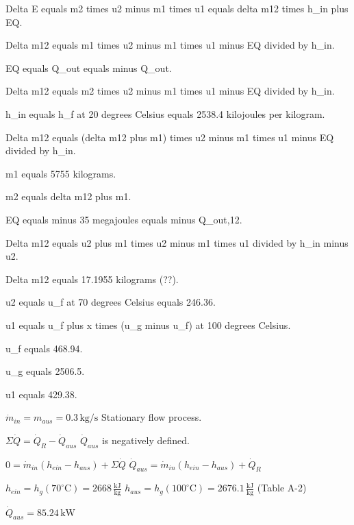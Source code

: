 Delta E equals m2 times u2 minus m1 times u1 equals delta m12 times h_in plus EQ.  

Delta m12 equals m1 times u2 minus m1 times u1 minus EQ divided by h_in.  

EQ equals Q_out equals minus Q_out.  

Delta m12 equals m2 times u2 minus m1 times u1 minus EQ divided by h_in.  

h_in equals h_f at 20 degrees Celsius equals 2538.4 kilojoules per kilogram.  

Delta m12 equals (delta m12 plus m1) times u2 minus m1 times u1 minus EQ divided by h_in.  

m1 equals 5755 kilograms.  

m2 equals delta m12 plus m1.  

EQ equals minus 35 megajoules equals minus Q_out,12.  

Delta m12 equals u2 plus m1 times u2 minus m1 times u1 divided by h_in minus u2.  

Delta m12 equals 17.1955 kilograms (??).  

u2 equals u_f at 70 degrees Celsius equals 246.36.  

u1 equals u_f plus x times (u_g minus u_f) at 100 degrees Celsius.  

u_f equals 468.94.  

u_g equals 2506.5.  

u1 equals 429.38.

\( \dot{m}_{in} = m_{aus} = 0.3 \, \text{kg/s} \)  
Stationary flow process.  

\( \Sigma \dot{Q} = \dot{Q}_R - \dot{Q}_{aus} \)  
\( \dot{Q}_{aus} \) is negatively defined.  

\( 0 = \dot{m}_{in} (h_{ein} - h_{aus}) + \Sigma \dot{Q} \)  
\( \dot{Q}_{aus} = \dot{m}_{in} (h_{ein} - h_{aus}) + \dot{Q}_R \)  

\( h_{ein} = h_g (70^\circ \text{C}) = 2668 \, \frac{\text{kJ}}{\text{kg}} \)  
\( h_{aus} = h_g (100^\circ \text{C}) = 2676.1 \, \frac{\text{kJ}}{\text{kg}} \)  
(Table A-2)  

\( \dot{Q}_{aus} = 85.24 \, \text{kW} \)